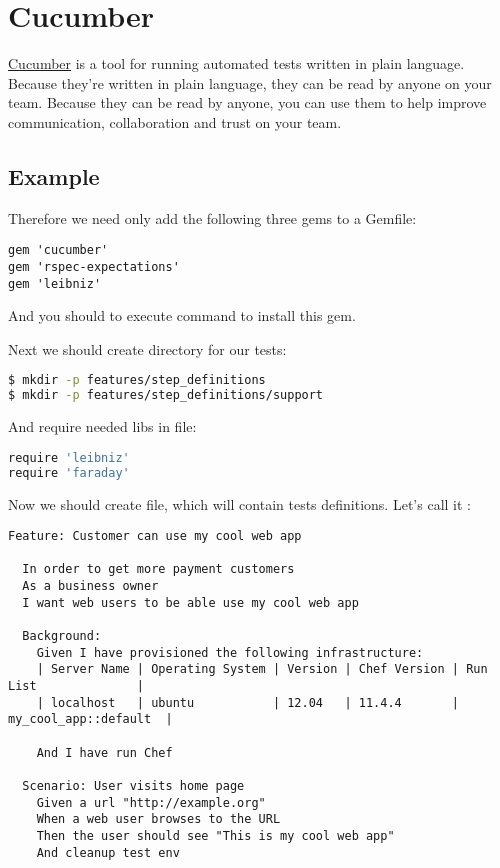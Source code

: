 \section{Cucumber}
\label{sec:testing-cucumber-spec}

\href{http://cukes.info/}{Cucumber} is a tool for running automated tests written in plain language. Because they're written in plain language, they can be read by anyone on your team. Because they can be read by anyone, you can use them to help improve communication, collaboration and trust on your team.

\subsection{Example}

Therefore we need only add the following three gems to a Gemfile:

\begin{lstlisting}[label=lst:testing-cucumber-spec1]
gem 'cucumber'
gem 'rspec-expectations'
gem 'leibniz'
\end{lstlisting}

And you should to execute  command to install this gem.

Next we should create directory for our tests:

\begin{lstlisting}[language=Bash,label=lst:testing-cucumber-spec2]
$ mkdir -p features/step_definitions
$ mkdir -p features/step_definitions/support
\end{lstlisting}

And require needed libs in  file:

\begin{lstlisting}[language=Bash,label=lst:testing-cucumber-spec3]
require 'leibniz'
require 'faraday'
\end{lstlisting}

Now we should create file, which will contain tests definitions. Let's call it :

\begin{lstlisting}[label=lst:testing-cucumber-spec4]
Feature: Customer can use my cool web app

  In order to get more payment customers
  As a business owner
  I want web users to be able use my cool web app

  Background:
    Given I have provisioned the following infrastructure:
    | Server Name | Operating System | Version | Chef Version | Run List              |
    | localhost   | ubuntu           | 12.04   | 11.4.4       | my_cool_app::default  |

    And I have run Chef

  Scenario: User visits home page
    Given a url "http://example.org"
    When a web user browses to the URL
    Then the user should see "This is my cool web app"
    And cleanup test env
\end{lstlisting}

